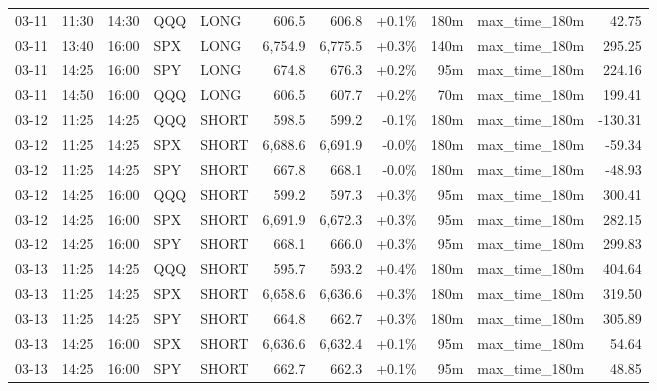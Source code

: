 \documentclass[11pt,a4paper,twoside]{article}
\begin{document}
\begin{center}
\begin{longtable}{>{\color{txtmain}}l l l l l r r r r >{\color{txtmain}}l r}
03-11 & 11:30 & 14:30 & QQQ & LONG & 606.5 & 606.8 & \textcolor{wingreen}{+0.1\%} & 180m & max\_time\_180m & \textcolor{wingreen}{42.75} \\
03-11 & 13:40 & 16:00 & SPX & LONG & 6,754.9 & 6,775.5 & \textcolor{wingreen}{+0.3\%} & 140m & max\_time\_180m & \textcolor{wingreen}{295.25} \\
03-11 & 14:25 & 16:00 & SPY & LONG & 674.8 & 676.3 & \textcolor{wingreen}{+0.2\%} & 95m & max\_time\_180m & \textcolor{wingreen}{224.16} \\
03-11 & 14:50 & 16:00 & QQQ & LONG & 606.5 & 607.7 & \textcolor{wingreen}{+0.2\%} & 70m & max\_time\_180m & \textcolor{wingreen}{199.41} \\
03-12 & 11:25 & 14:25 & QQQ & SHORT & 598.5 & 599.2 & \textcolor{lossred}{-0.1\%} & 180m & max\_time\_180m & \textcolor{lossred}{-130.31} \\
03-12 & 11:25 & 14:25 & SPX & SHORT & 6,688.6 & 6,691.9 & \textcolor{lossred}{-0.0\%} & 180m & max\_time\_180m & \textcolor{lossred}{-59.34} \\
03-12 & 11:25 & 14:25 & SPY & SHORT & 667.8 & 668.1 & \textcolor{lossred}{-0.0\%} & 180m & max\_time\_180m & \textcolor{lossred}{-48.93} \\
03-12 & 14:25 & 16:00 & QQQ & SHORT & 599.2 & 597.3 & \textcolor{wingreen}{+0.3\%} & 95m & max\_time\_180m & \textcolor{wingreen}{300.41} \\
03-12 & 14:25 & 16:00 & SPX & SHORT & 6,691.9 & 6,672.3 & \textcolor{wingreen}{+0.3\%} & 95m & max\_time\_180m & \textcolor{wingreen}{282.15} \\
03-12 & 14:25 & 16:00 & SPY & SHORT & 668.1 & 666.0 & \textcolor{wingreen}{+0.3\%} & 95m & max\_time\_180m & \textcolor{wingreen}{299.83} \\
03-13 & 11:25 & 14:25 & QQQ & SHORT & 595.7 & 593.2 & \textcolor{wingreen}{+0.4\%} & 180m & max\_time\_180m & \textcolor{wingreen}{404.64} \\
03-13 & 11:25 & 14:25 & SPX & SHORT & 6,658.6 & 6,636.6 & \textcolor{wingreen}{+0.3\%} & 180m & max\_time\_180m & \textcolor{wingreen}{319.50} \\
03-13 & 11:25 & 14:25 & SPY & SHORT & 664.8 & 662.7 & \textcolor{wingreen}{+0.3\%} & 180m & max\_time\_180m & \textcolor{wingreen}{305.89} \\
03-13 & 14:25 & 16:00 & SPX & SHORT & 6,636.6 & 6,632.4 & \textcolor{wingreen}{+0.1\%} & 95m & max\_time\_180m & \textcolor{wingreen}{54.64} \\
03-13 & 14:25 & 16:00 & SPY & SHORT & 662.7 & 662.3 & \textcolor{wingreen}{+0.1\%} & 95m & max\_time\_180m & \textcolor{wingreen}{48.85} \\

\end{longtable}
\end{center}
\end{document}
